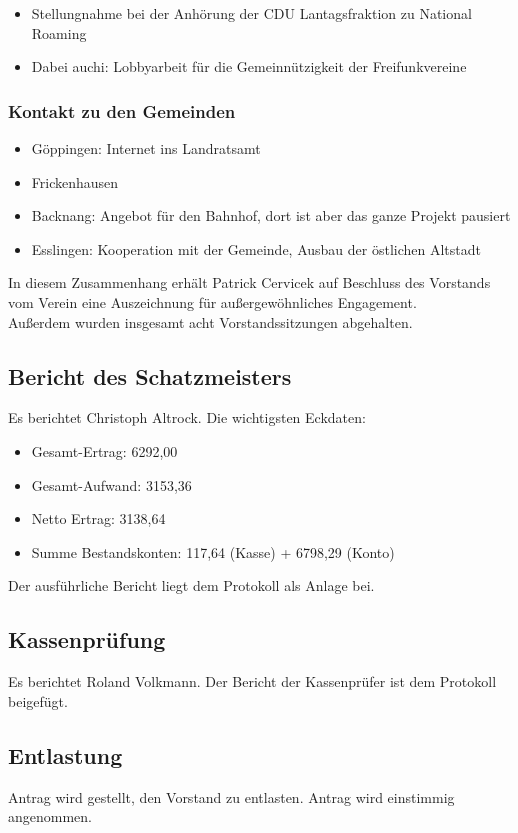 \documentclass[a4paper]{scrartcl}
\begin{document}
\begin{itemize}
\item Stellungnahme bei der Anhörung der CDU Lantagsfraktion zu National Roaming
\item Dabei auchi: Lobbyarbeit für die Gemeinnützigkeit der Freifunkvereine
\end{itemize}

\subsubsection{Kontakt zu den Gemeinden}

\begin{itemize}
\item Göppingen: Internet ins Landratsamt
\item Frickenhausen
\item Backnang: Angebot für den Bahnhof, dort ist aber das ganze Projekt pausiert
\item Esslingen: Kooperation mit der Gemeinde, Ausbau der östlichen Altstadt
\end{itemize}

In diesem Zusammenhang erhält Patrick Cervicek auf Beschluss des Vorstands vom Verein eine Auszeichnung für außergewöhnliches Engagement.
\\
Außerdem wurden insgesamt acht Vorstandssitzungen abgehalten.

\subsection{Bericht des Schatzmeisters}
Es berichtet Christoph Altrock. Die wichtigsten Eckdaten:
\begin{itemize}
\item Gesamt-Ertrag:  6292,00 \texteuro
\item Gesamt-Aufwand:  3153,36 \texteuro
\item Netto Ertrag:  3138,64 \texteuro
\item Summe Bestandskonten: 117,64 \texteuro  (Kasse) + 6798,29 \texteuro  (Konto) 
\end{itemize}
Der ausführliche Bericht liegt dem Protokoll als Anlage bei.
\subsection{Kassenprüfung}
Es berichtet Roland Volkmann. Der Bericht der Kassenprüfer ist dem Protokoll beigefügt.
\subsection{Entlastung}
Antrag wird gestellt, den Vorstand zu entlasten. Antrag wird einstimmig angenommen.
\end{document}
